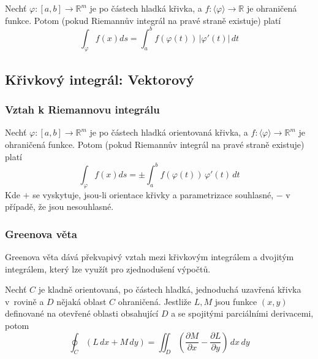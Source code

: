 \begin{theorem}
Nechť $\varphi : [a,b] \to \mathbb{R}^m$ je po částech hladká křivka,
a $f : \langle \varphi \rangle \to \mathbb{R}$ je ohraničená funkce.
Potom (pokud Riemannův integrál na pravé straně existuje) platí
\[
 \int_\varphi f(x) ds = \int_a^b f(\varphi(t)) \, \lvert \varphi'(t) \rvert \, dt
\]
\end{theorem}

\begin{example}
\end{example}

\pagebreak

\subsection{Křivkový integrál: Vektorový}

\subsubsection{Vztah k Riemannovu integrálu}

\begin{theorem}
Nechť $\varphi : [a,b] \to \mathbb{R}^m$ je po částech hladká
orientovaná křivka,
a $f : \langle \varphi \rangle \to \mathbb{R}^m$ je ohraničená funkce.
Potom (pokud Riemannův integrál na pravé straně existuje) platí
\[
 \int_\varphi f(x) ds = \pm \int_a^b f(\varphi(t)) \, \varphi'(t) \, dt
\]
Kde $+$ se vyskytuje, jsou-li orientace křivky a parametrizace souhlasné,
$-$ v případě, že jsou nesouhlasné.

\end{theorem}

\begin{example}
\end{example}

\subsubsection{Greenova věta}

Greenova věta dává překvapivý vztah mezi křivkovým integrálem a dvojitým
integrálem, který lze využít pro zjednodušení výpočtů.

\begin{theorem}
    Nechť $C$ je kladně orientovaná, po částech hladká, jednoduchá
    uzavřená křivka v~rovině a $D$ nějaká oblast $C$ ohraničená.
    Jestliže $L,M$ jsou funkce $(x,y)$ definované na otevřené oblasti
    obsahující $D$ a se spojitými parciálními derivacemi, potom
    \[
    \oint_{C} (L\, dx + M\, dy) = \iint_{D} \left(\frac{\partial M}{\partial x} - \frac{\partial L}{\partial y}\right)\, dx\, dy
\]
\end{theorem}

\begin{example}
\end{example}
